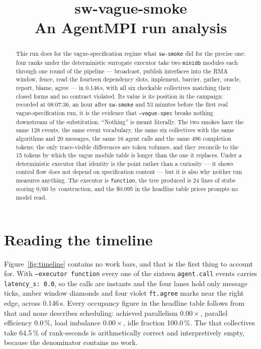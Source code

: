 \documentclass[11pt]{article}
\title{\textbf{sw-vague-smoke}\\[2pt]\large An AgentMPI run analysis}
\author{}
\date{}
\begin{document}
\maketitle

\begin{abstract}
This run does for the vague-specification regime what \texttt{sw-smoke} did for the precise
one: four ranks under the deterministic surrogate executor take two \texttt{minidb} modules
each through one round of the pipeline --- broadcast, publish interfaces into the RMA window,
fence, read the fourteen dependency slots, implement, barrier, gather, oracle, report, blame,
agree --- in 0.146\,s, with all six checkable collectives matching their closed forms and no
contract violated. Its value is its position in the campaign: recorded at 08:07:36, an hour
after \texttt{sw-smoke} and 53 minutes before the first real vague-specification run, it is the
evidence that \texttt{--vague-spec} breaks nothing downstream of the substitution. ``Nothing''
is meant literally. The two smokes have the same 128 events, the same event vocabulary, the
same six collectives with the same algorithms and 20 messages, the same 16 agent calls and the
same 496 completion tokens; the only trace-visible differences are token volumes, and they
reconcile to the 15 tokens by which the vague module table is longer than the one it replaces.
Under a deterministic executor that identity is the point rather than a curiosity --- it shows
control flow does not depend on specification content --- but it is also why neither run
measures anything. The executor is \texttt{function}, the tree produced is 24 lines of stubs
scoring 0/60 by construction, and the \$0.095 in the headline table prices prompts no model
read.
\end{abstract}



\section{Reading the timeline}

Figure~\ref{fig:timeline} contains no work bars, and that is the first thing to account for.
With \texttt{--executor function} every one of the sixteen \texttt{agent.call} events carries
\texttt{latency\_s: 0.0}, so the calls are instants and the four lanes hold only message ticks,
amber window diamonds and four violet \texttt{ft.agree} marks near the right edge, across
0.146\,s. Every occupancy figure in the headline table follows from that and none describes
scheduling: achieved parallelism $0.00\times$, parallel efficiency 0.0\,\%, load imbalance
$0.00\times$, idle fraction 100.0\,\%. The  that collectives take 64.5\,\% of
rank-seconds is arithmetically correct and interpretively empty, because the denominator
contains no work.
\end{document}
